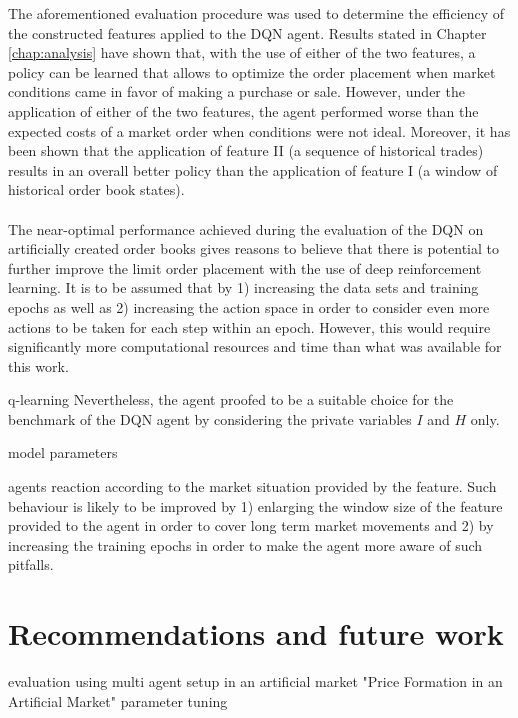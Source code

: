     The aforementioned evaluation procedure was used to determine the efficiency of the constructed features applied to the DQN agent.
    Results stated in Chapter \ref{chap:analysis} have shown that, with the use of either of the two features, a policy can be learned that allows to optimize the order placement when market conditions came in favor of making a purchase or sale.
    However, under the application of either of the two features, the agent performed worse than the expected costs of a market order when conditions were not ideal.
    Moreover, it has been shown that the application of feature II (a sequence of historical trades) results in an overall better policy than the application of feature I (a window of historical order book states).
    \\
    \\
The near-optimal performance achieved during the evaluation of the DQN on artificially created order books gives reasons to believe that there is potential to further improve the limit order placement with the use of deep reinforcement learning.
It is to be assumed that by 1) increasing the data sets and training epochs as well as 2) increasing the action space in order to consider even more actions to be taken for each step within an epoch.
However, this would require significantly more computational resources and time than what was available for this work.

q-learning Nevertheless, the agent proofed to be a suitable choice for the benchmark of the DQN agent by considering the private variables $I$ and $H$ only.

model parameters

agents reaction according to the market situation provided by the feature.
Such behaviour is likely to be improved by 1) enlarging the window size of the feature provided to the agent in order to cover long term market movements and 2) by increasing the training epochs in order to make the agent more aware of such pitfalls.



\section{Recommendations and future work}

evaluation using multi agent setup in an artificial market "Price Formation in an Artificial Market"
parameter tuning

